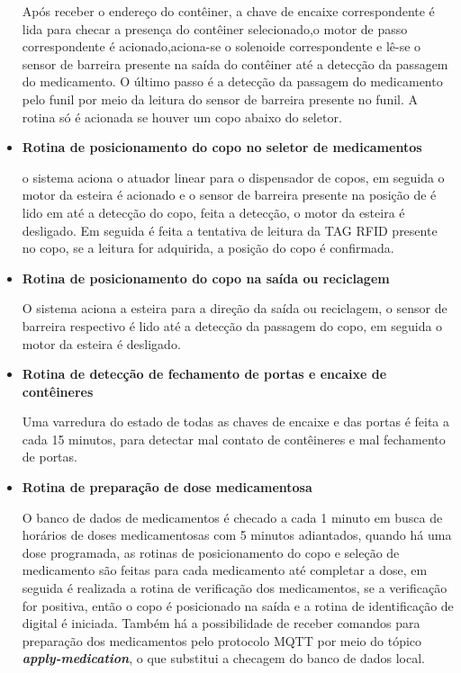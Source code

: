 \begin{itemize}
    Após receber o endereço do contêiner, a chave de encaixe correspondente é lida para checar a presença do contêiner selecionado,o motor de passo correspondente é acionado,aciona-se o solenoide correspondente e lê-se o sensor de barreira presente na saída do contêiner até a detecção da passagem do medicamento. O último passo é a detecção da passagem do medicamento pelo funil por meio da leitura do sensor de barreira presente no funil. A rotina só é acionada se houver um copo abaixo do seletor.
    
    \item \textbf{Rotina de posicionamento do copo no seletor de medicamentos}
    
    o sistema aciona o atuador linear para o dispensador de copos, em seguida o motor da esteira é acionado e o sensor de barreira presente na posição de é lido em  até a detecção do copo, feita a detecção, o motor da esteira é desligado. Em seguida é feita a tentativa de leitura da TAG RFID presente no copo, se a leitura for adquirida, a posição do copo é confirmada.
    
    \item \textbf{Rotina de posicionamento do copo na saída ou reciclagem}
    
    O sistema aciona a esteira para a direção da saída ou reciclagem, o sensor de barreira respectivo é lido até a detecção da passagem do copo, em seguida o motor da esteira é desligado.
    
    \item \textbf{Rotina de detecção de fechamento de portas e encaixe de contêineres}
    
    Uma varredura do estado de todas as chaves de encaixe e das portas é feita a cada 15 minutos, para detectar mal contato de contêineres e mal fechamento de portas.
    
    \item \textbf{Rotina de preparação de dose medicamentosa}
    
    O banco de dados de medicamentos é checado a cada 1 minuto em busca de horários de doses medicamentosas com 5 minutos adiantados, quando há uma dose programada, as rotinas de posicionamento do copo e seleção de medicamento são feitas para cada medicamento até completar a dose, em seguida é realizada a rotina de verificação dos medicamentos, se a verificação for positiva, então o copo é posicionado na saída e a rotina de identificação de digital é iniciada.
    Também há a possibilidade de receber comandos para preparação dos medicamentos pelo protocolo MQTT por meio do tópico \textit{\textbf{apply-medication}}, o que substitui a checagem do banco de dados local.
    

\end{itemize}
